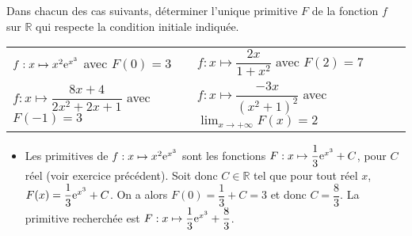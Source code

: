 \documentclass[11pt,fleqn, openany]{book} %
\begin{document}
\begin{exercise}Dans chacun des cas suivants, déterminer l'unique primitive $F$ de la fonction $f$ sur $\mathbb{R}$ qui respecte la condition initiale indiquée.

\renewcommand{\arraystretch}{2}
\begin{tabularx}{\linewidth}{XX}
 $f:x\mapsto x^2\mathrm{e}^{x^3}$  avec $F(0)=3$
&
 $f:x\mapsto \dfrac{2x}{1+x^2}$  avec $F(2)=7$
\\
 $f:x\mapsto \dfrac{8x+4}{2x^2+2x+1}$ avec $F(-1)=3$
&
 $f:x\mapsto \dfrac{-3x}{(x^2+1)^2}$  avec $\displaystyle\lim_{x \to +\infty}F(x)=2$
\end{tabularx}\end{exercise}

\begin{solution} \hspace{0pt}

\begin{itemize}
\item Les primitives de \(f:x\mapsto x^2\mathrm{e}^{x^3}\) sont les fonctions \(F:x\mapsto \dfrac{1}{3}\mathrm{e}^{x^3}+C\), pour \(C\) réel (voir exercice précédent). Soit donc \(C\in\mathbb{R}\) tel que pour tout réel \(x\), \(F(x)=  \dfrac{1}{3}\mathrm{e}^{x^3}+C\). On a alors \(F(0)=\dfrac{1}{3}+C=3\) et donc \(C=\dfrac{8}{3}\). La primitive recherchée est \(F:x\mapsto \dfrac{1}{3}\mathrm{e}^{x^3}+\dfrac{8}{3}\).

\vskip5pt


\end{itemize}
\end{solution}
\end{document}
